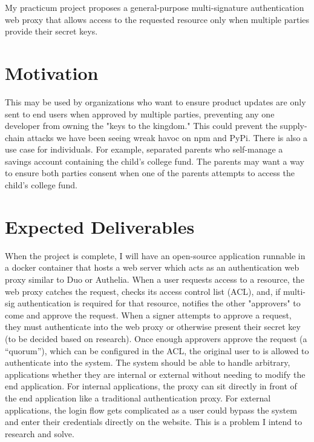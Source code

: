 \documentclass[12pt]{article}
\begin{document}
My practicum project proposes a general-purpose multi-signature authentication web proxy that allows access to the requested resource only when multiple parties provide their secret keys.

\section{Motivation}

This may be used by organizations who want to ensure product updates are only sent to end users when approved by multiple parties, preventing any one developer from owning the "keys to the kingdom." This could prevent the supply-chain attacks we have been seeing wreak havoc on npm and PyPi. There is also a use case for individuals. For example, separated parents who self-manage a savings account containing the child's college fund. The parents may want a way to ensure both parties consent when one of the parents attempts to access the child's college fund.

\section{Expected Deliverables}

When the project is complete, I will have an open-source application runnable in a docker container that hosts a web server which acts as an authentication web proxy similar to Duo or Authelia. When a user requests access to a resource, the web proxy catches the request, checks its access control list (ACL), and, if multi-sig authentication is required for that resource, notifies the other "approvers" to come and approve the request. When a signer attempts to approve a request, they must authenticate into the web proxy or otherwise present their secret key (to be decided based on research). Once enough approvers approve the request (a ``quorum''), which can be configured in the ACL, the original user to is allowed to authenticate into the system. The system should be able to handle arbitrary, applications whether they are internal or external without needing to modify the end application. For internal applications, the proxy can sit directly in front of the end application like a traditional authentication proxy. For external applications, the login flow gets complicated as a user could bypass the system and enter their credentials directly on the website. This is a problem I intend to research and solve.
\end{document}
